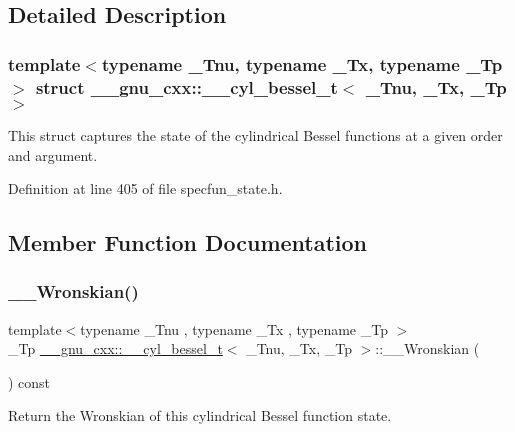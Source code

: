 \subsection{Detailed Description}
\subsubsection*{template$<$typename \+\_\+\+Tnu, typename \+\_\+\+Tx, typename \+\_\+\+Tp$>$\newline
struct \+\_\+\+\_\+gnu\+\_\+cxx\+::\+\_\+\+\_\+cyl\+\_\+bessel\+\_\+t$<$ \+\_\+\+Tnu, \+\_\+\+Tx, \+\_\+\+Tp $>$}

This struct captures the state of the cylindrical Bessel functions at a given order and argument. 

Definition at line 405 of file specfun\+\_\+state.\+h.



\subsection{Member Function Documentation}
\mbox{\label{struct____gnu__cxx_1_1____cyl__bessel__t_aa311a0f4636243a07d0c1d0660e5c213}} 
\subsubsection{\texorpdfstring{\+\_\+\+\_\+\+Wronskian()}{\_\_Wronskian()}}
{\footnotesize\ttfamily template$<$typename \+\_\+\+Tnu , typename \+\_\+\+Tx , typename \+\_\+\+Tp $>$ \\
\+\_\+\+Tp \hyperlink{struct____gnu__cxx_1_1____cyl__bessel__t}{\+\_\+\+\_\+gnu\+\_\+cxx\+::\+\_\+\+\_\+cyl\+\_\+bessel\+\_\+t}$<$ \+\_\+\+Tnu, \+\_\+\+Tx, \+\_\+\+Tp $>$\+::\+\_\+\+\_\+\+Wronskian (\begin{DoxyParamCaption}{ }\end{DoxyParamCaption}) const\hspace{0.3cm}{\ttfamily [inline]}}



Return the Wronskian of this cylindrical Bessel function state. 



